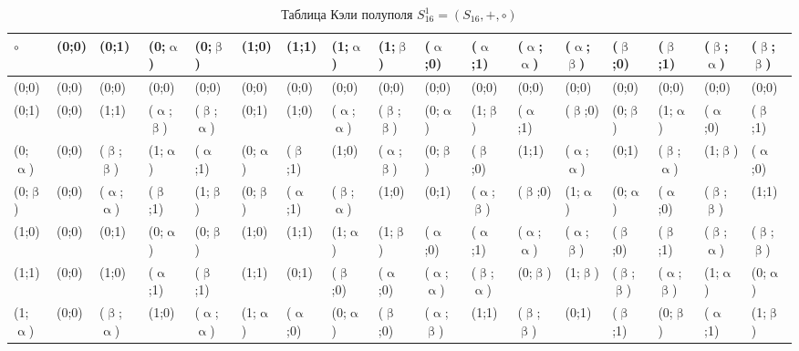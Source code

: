 
\begin{table}
\caption{Таблица Кэли полуполя $S^1_{16}=(S_{16},+,\circ)$}
\label{tab:zhelydeva}
\begin{changemargin}{-2cm}{0cm}
\begin{tabular}{p{0.7cm}|p{0.5cm}p{0.5cm}p{0.5cm}p{0.5cm}p{0.5cm}p{0.5cm}p{0.5cm}p{0.5cm}p{0.5cm}p{0.5cm}p{0.5cm}p{0.5cm}p{0.5cm}p{0.5cm}p{0.5cm}p{0.5cm}}
$\circ$     & (0;0) & (0;1) & (0;$\upalpha$) & (0;$\upbeta$) & (1;0) & (1;1) & (1;$\upalpha$) & (1;$\upbeta$) & ($\upalpha$;0) & ($\upalpha$;1) & ($\upalpha$;$\upalpha$) & ($\upalpha$;$\upbeta$) & ($\upbeta$;0) & ($\upbeta$;1) & ($\upbeta$;$\upalpha$) & ($\upbeta$;$\upbeta$) \\\hline


(0;0) & (0;0) & (0;0) & (0;0) & (0;0) & (0;0) & (0;0) & (0;0) & (0;0) & (0;0) & (0;0) & (0;0) & (0;0) & (0;0) & (0;0) & (0;0) & (0;0) \\
(0;1) & (0;0) & (1;1) & ($\upalpha$;$\upbeta$) & ($\upbeta$;$\upalpha$) & (0;1) & (1;0) & ($\upalpha$;$\upalpha$) & ($\upbeta$;$\upbeta$) & (0;$\upalpha$) & (1;$\upbeta$) & ($\upalpha$;1) & ($\upbeta$;0) & (0;$\upbeta$) & (1;$\upalpha$) & ($\upalpha$;0) & ($\upbeta$;1) \\
(0;$\upalpha$) & (0;0) & ($\upbeta$;$\upbeta$) & (1;$\upalpha$) & ($\upalpha$;1) & (0;$\upalpha$) & ($\upbeta$;1) & (1;0) & ($\upalpha$;$\upbeta$) & (0;$\upbeta$) & ($\upbeta$;0) & (1;1) & ($\upalpha$;$\upalpha$) & (0;1) & ($\upbeta$;$\upalpha$) & (1;$\upbeta$) & ($\upalpha$;0) \\
(0;$\upbeta$) & (0;0) & ($\upalpha$;$\upalpha$) & ($\upbeta$;1) & (1;$\upbeta$) & (0;$\upbeta$) & ($\upalpha$;1) & ($\upbeta$;$\upalpha$) & (1;0) & (0;1) & ($\upalpha$;$\upbeta$) & ($\upbeta$;0) & (1;$\upalpha$) & (0;$\upalpha$) & ($\upalpha$;0) & ($\upbeta$;$\upbeta$) & (1;1) \\
(1;0) & (0;0) & (0;1) & (0;$\upalpha$) & (0;$\upbeta$) & (1;0) & (1;1) & (1;$\upalpha$) & (1;$\upbeta$) & ($\upalpha$;0) & ($\upalpha$;1) & ($\upalpha$;$\upalpha$) & ($\upalpha$;$\upbeta$) & ($\upbeta$;0) & ($\upbeta$;1) & ($\upbeta$;$\upalpha$) & ($\upbeta$;$\upbeta$) \\
(1;1) & (0;0) & (1;0) & ($\upalpha$;1) & ($\upbeta$;1) & (1;1) & (0;1) & ($\upbeta$;0) & ($\upalpha$;0) & ($\upalpha$;$\upalpha$) & ($\upbeta$;$\upalpha$) & (0;$\upbeta$) & (1;$\upbeta$) & ($\upbeta$;$\upbeta$) & ($\upalpha$;$\upbeta$) & (1;$\upalpha$) & (0;$\upalpha$) \\
(1;$\upalpha$) & (0;0) & ($\upbeta$;$\upalpha$) & (1;0) & ($\upalpha$;$\upalpha$) & (1;$\upalpha$) & ($\upalpha$;0) & (0;$\upalpha$) & ($\upbeta$;0) & ($\upalpha$;$\upbeta$) & (1;1) & ($\upbeta$;$\upbeta$) & (0;1) & ($\upbeta$;1) & (0;$\upbeta$) & ($\upalpha$;1) & (1;$\upbeta$) \\

\end{tabular}
\end{changemargin}
\end{table}
